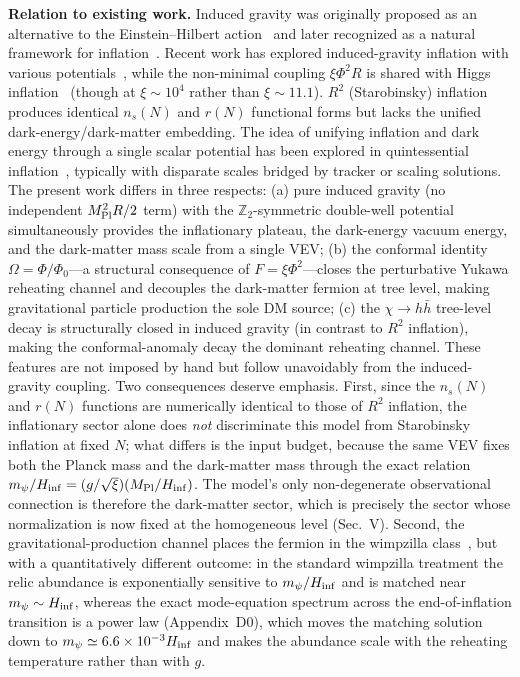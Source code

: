 \documentclass[pdflatex,sn-mathphys-num]{sn-jnl}
\newcommand{\MP}{M_{\rm Pl}}
\newcommand{\Ztwo}{\mathbb{Z}_2}
\newcommand{\PhiV}{\Phi_0}
\theoremstyle{thmstyleone}
\begin{document}
\textbf{Relation to existing work.} Induced gravity was originally proposed as an alternative to the Einstein--Hilbert action~\cite{Zee1979,Smolin1979} and later recognized as a natural framework for inflation~\cite{Spokoiny1984,Lucchin1985}. Recent work has explored induced-gravity inflation with various potentials~\cite{KalloshLinde,GiudiceLee2014}, while the non-minimal coupling $\xi\Phi^2R$ is shared with Higgs inflation~\cite{Bezrukov2008} (though at $\xi\sim10^4$ rather than $\xi\sim11.1$). $R^2$ (Starobinsky) inflation~\cite{Starobinsky1980} produces identical $n_s(N)$ and $r(N)$ functional forms but lacks the unified dark-energy/dark-matter embedding. The idea of unifying inflation and dark energy through a single scalar potential has been explored in quintessential inflation~\cite{PeeblesVilenkin,DimopoulosOwen}, typically with disparate scales bridged by tracker or scaling solutions. The present work differs in three respects: (a) pure induced gravity (no independent $M_{\rm Pl}^2R/2$ term) with the $\Ztwo$-symmetric double-well potential simultaneously provides the inflationary plateau, the dark-energy vacuum energy, and the dark-matter mass scale from a single VEV; (b) the conformal identity $\Omega=\Phi/\PhiV$---a structural consequence of $F=\xi\Phi^2$---closes the perturbative Yukawa reheating channel and decouples the dark-matter fermion at tree level, making gravitational particle production the sole DM source; (c) the $\chi\to h\bar h$ tree-level decay is structurally closed in induced gravity (in contrast to $R^2$ inflation), making the conformal-anomaly decay the dominant reheating channel. These features are not imposed by hand but follow unavoidably from the induced-gravity coupling. Two consequences deserve emphasis. First, since the $n_s(N)$ and $r(N)$ functions are numerically identical to those of $R^2$ inflation, the inflationary sector alone does \emph{not} discriminate this model from Starobinsky inflation at fixed $N$; what differs is the input budget, because the same VEV fixes both the Planck mass and the dark-matter mass through the exact relation $m_\psi/H_{\rm inf}=(g/\sqrt{\xi})(\MP/H_{\rm inf})$. The model's only non-degenerate observational connection is therefore the dark-matter sector, which is precisely the sector whose normalization is now fixed at the homogeneous level (Sec.~V). Second, the gravitational-production channel places the fermion in the wimpzilla class~\cite{ChungKolbRiotto1998,KolbChungRiotto1999,KuzminRubakov1998}, but with a quantitatively different outcome: in the standard wimpzilla treatment the relic abundance is exponentially sensitive to $m_\psi/H_{\rm inf}$ and is matched near $m_\psi\sim H_{\rm inf}$, whereas the exact mode-equation spectrum across the end-of-inflation transition is a power law (Appendix~D0), which moves the matching solution down to $m_\psi\simeq6.6\times10^{-3}H_{\rm inf}$ and makes the abundance scale with the reheating temperature rather than with $g$.
\end{document}

